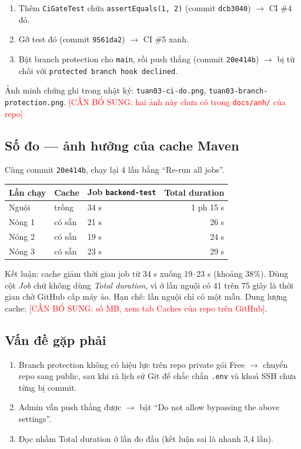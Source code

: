 \documentclass[12pt,a4paper]{article}
\newcommand{\canbosung}[1]{\textcolor{red}{[CẦN BỔ SUNG: #1]}}
\newcommand{\commit}[1]{\texttt{#1}}
\begin{document}
\begin{enumerate}
  \item Thêm \texttt{CiGateTest} chứa \texttt{assertEquals(1, 2)}
        (commit \commit{dcb3040}) $\rightarrow$ CI \#4 đỏ.
  \item Gỡ test đó (commit \commit{9561da2}) $\rightarrow$ CI \#5 xanh.
  \item Bật branch protection cho \texttt{main}, rồi push thẳng
        (commit \commit{20e414b}) $\rightarrow$ bị từ chối với
        \texttt{protected branch hook declined}.
\end{enumerate}

Ảnh minh chứng ghi trong nhật ký: \texttt{tuan03-ci-do.png},
\texttt{tuan03-branch-protection.png}.
\canbosung{hai ảnh này chưa có trong \texttt{docs/anh/} của repo}

\subsection{Số đo — ảnh hưởng của cache Maven}

Cùng commit \commit{20e414b}, chạy lại 4 lần bằng ``Re-run all jobs''.

\begin{center}
\begin{tabular}{lllr}
\toprule
Lần chạy & Cache & Job \texttt{backend-test} & Total duration \\
\midrule
Nguội & trống  & 34 s & 1 ph 15 s \\
Nóng 1 & có sẵn & 21 s & 26 s \\
Nóng 2 & có sẵn & 19 s & 24 s \\
Nóng 3 & có sẵn & 23 s & 29 s \\
\bottomrule
\end{tabular}
\end{center}

Kết luận: cache giảm thời gian job từ 34 s xuống 19–23 s (khoảng 38\%).
Dùng cột \emph{Job} chứ không dùng \emph{Total duration}, vì ở lần nguội có 41
trên 75 giây là thời gian chờ GitHub cấp máy ảo.
Hạn chế: lần nguội chỉ có một mẫu.
Dung lượng cache: \canbosung{số MB, xem tab Caches của repo trên GitHub}.

\subsection{Vấn đề gặp phải}
\begin{enumerate}
  \item Branch protection không có hiệu lực trên repo private gói Free
        $\rightarrow$ chuyển repo sang public, sau khi rà lịch sử Git để chắc
        chắn \texttt{.env} và khoá SSH chưa từng bị commit.
  \item Admin vẫn push thẳng được $\rightarrow$ bật
        ``Do not allow bypassing the above settings''.
  \item Đọc nhầm Total duration ở lần đo đầu (kết luận sai là nhanh 3,4 lần).
\end{enumerate}
\end{document}
